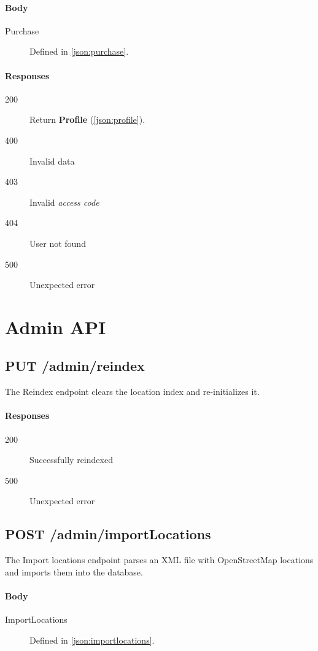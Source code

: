 		\paragraph*{Body}
			\begin{description}
				\item[Purchase] Defined in \ref{json:purchase}.
			\end{description}
		\paragraph*{Responses}
			\begin{description}		
				\item[200] Return \textbf{Profile} (\ref{json:profile}).
				\item[400] Invalid data
				\item[403] Invalid \textit{access code}
				\item[404] User not found
				\item[500] Unexpected error
			\end{description}

\section{Admin API}

	\subsection{PUT /admin/reindex}
	The Reindex endpoint clears the location index and re-initializes it.
		\paragraph*{Responses}
		\begin{description}		
			\item[200] Successfully reindexed
			\item[500] Unexpected error
		\end{description}

	\subsection{POST /admin/importLocations}
	The Import locations endpoint parses an XML file with OpenStreetMap locations and imports them into the database.
		\paragraph*{Body}
			\begin{description}
				\item[ImportLocations] Defined in \ref{json:importlocations}.
			\end{description}
